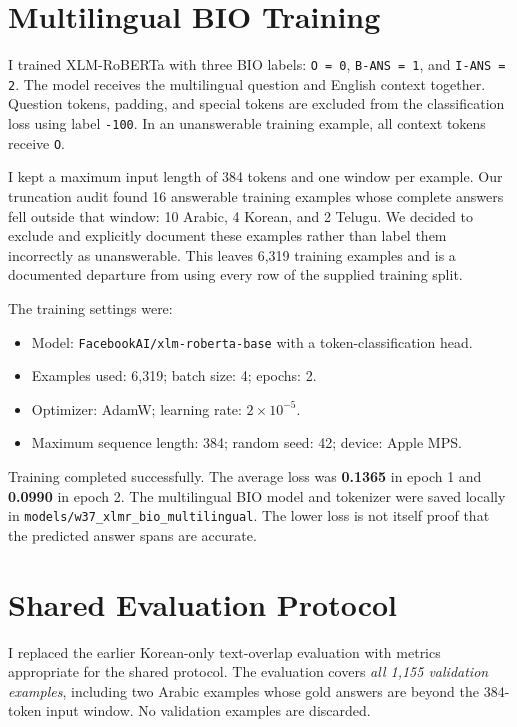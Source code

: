 \documentclass[a4paper,11pt]{article}
\begin{document}
\section{Multilingual BIO Training}

I trained XLM-RoBERTa with three BIO labels: \texttt{O = 0}, \texttt{B-ANS = 1}, and \texttt{I-ANS = 2}. The model receives the multilingual question and English context together. Question tokens, padding, and special tokens are excluded from the classification loss using label \texttt{-100}. In an unanswerable training example, all context tokens receive \texttt{O}.

I kept a maximum input length of 384 tokens and one window per example. Our truncation audit found 16 answerable training examples whose complete answers fell outside that window: 10 Arabic, 4 Korean, and 2 Telugu. We decided to exclude and explicitly document these examples rather than label them incorrectly as unanswerable. This leaves 6,319 training examples and is a documented departure from using every row of the supplied training split.

The training settings were:
\begin{itemize}[noitemsep]
    \item Model: \texttt{FacebookAI/xlm-roberta-base} with a token-classification head.
    \item Examples used: 6,319; batch size: 4; epochs: 2.
    \item Optimizer: AdamW; learning rate: $2 \times 10^{-5}$.
    \item Maximum sequence length: 384; random seed: 42; device: Apple MPS.
\end{itemize}

Training completed successfully. The average loss was \textbf{0.1365} in epoch 1 and \textbf{0.0990} in epoch 2. The multilingual BIO model and tokenizer were saved locally in \texttt{models/w37\_xlmr\_bio\_multilingual}. The lower loss is not itself proof that the predicted answer spans are accurate.

\section{Shared Evaluation Protocol}

I replaced the earlier Korean-only text-overlap evaluation with metrics appropriate for the shared protocol. The evaluation covers \emph{all 1,155 validation examples}, including two Arabic examples whose gold answers are beyond the 384-token input window. No validation examples are discarded.
\end{document}
